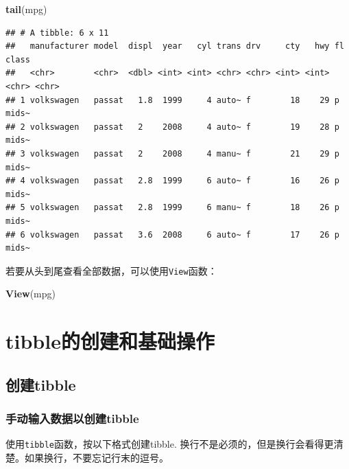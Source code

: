 \documentclass[]{book}
\newenvironment{Shaded}{\begin{snugshade}}{\end{snugshade}}
\newcommand{\KeywordTok}[1]{\textcolor[rgb]{0.13,0.29,0.53}{\textbf{#1}}}
\newcommand{\NormalTok}[1]{#1}
\begin{document}
\begin{Shaded}
\begin{Highlighting}[]
\KeywordTok{tail}\NormalTok{(mpg)}
\end{Highlighting}
\end{Shaded}

\begin{verbatim}
## # A tibble: 6 x 11
##   manufacturer model  displ  year   cyl trans drv     cty   hwy fl    class
##   <chr>        <chr>  <dbl> <int> <int> <chr> <chr> <int> <int> <chr> <chr>
## 1 volkswagen   passat   1.8  1999     4 auto~ f        18    29 p     mids~
## 2 volkswagen   passat   2    2008     4 auto~ f        19    28 p     mids~
## 3 volkswagen   passat   2    2008     4 manu~ f        21    29 p     mids~
## 4 volkswagen   passat   2.8  1999     6 auto~ f        16    26 p     mids~
## 5 volkswagen   passat   2.8  1999     6 manu~ f        18    26 p     mids~
## 6 volkswagen   passat   3.6  2008     6 auto~ f        17    26 p     mids~
\end{verbatim}

若要从头到尾查看全部数据，可以使用\texttt{View}函数：

\begin{Shaded}
\begin{Highlighting}[]
\KeywordTok{View}\NormalTok{(mpg)}
\end{Highlighting}
\end{Shaded}

\hypertarget{tibble-basics}{%
\section{tibble的创建和基础操作}\label{tibble-basics}}

\hypertarget{tibble-create}{%
\subsection{创建tibble}\label{tibble-create}}

\hypertarget{tibble-create-manual}{%
\subsubsection{手动输入数据以创建tibble}\label{tibble-create-manual}}

使用\texttt{tibble}函数，按以下格式创建tibble. 换行不是必须的，但是换行会看得更清楚。如果换行，不要忘记行末的逗号。
\end{document}
